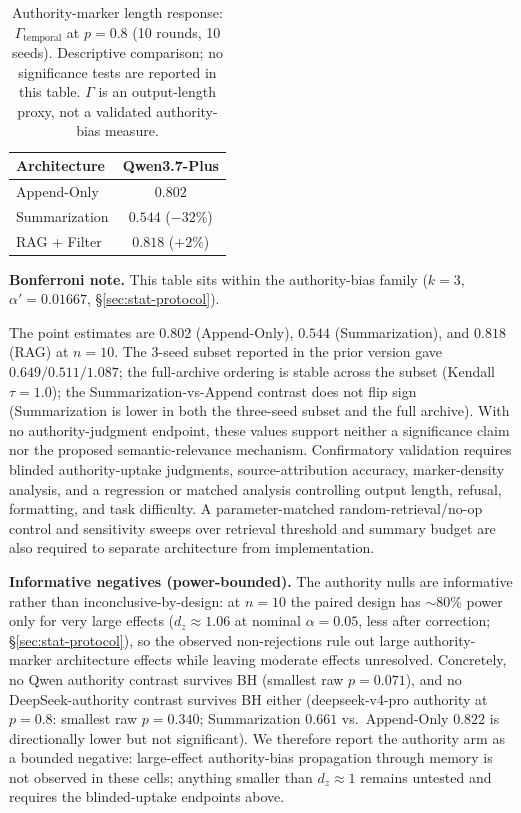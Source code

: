 \documentclass[11pt]{article}
\begin{document}
\begin{table}[htbp]
\centering
\caption{Authority-marker length response: $\Gamma_{\text{temporal}}$ at $p=0.8$ (10 rounds, 10 seeds). Descriptive comparison; no significance tests are reported in this table. $\Gamma$ is an output-length proxy, not a validated authority-bias measure.}
\label{tab:authority}
\begin{tabular}{lc}
\toprule
Architecture & Qwen3.7-Plus \\
\midrule
Append-Only & $0.802$ \\
Summarization & $0.544$ ($-32\%$) \\
RAG + Filter & $0.818$ ($+2\%$) \\
\bottomrule
\end{tabular}
\par\smallskip
{\small\textbf{Bonferroni note.} This table sits within the authority-bias family ($k=3$, $\alpha' = 0.01667$, \S\ref{sec:stat-protocol}).}
\end{table}

The point estimates are $0.802$ (Append-Only), $0.544$ (Summarization), and $0.818$ (RAG) at $n{=}10$. The $3$-seed subset reported in the prior version gave $0.649/0.511/1.087$; the full-archive ordering is stable across the subset (Kendall $\tau=1.0$); the Summarization-vs-Append contrast does not flip sign (Summarization is lower in both the three-seed subset and the full archive). With no authority-judgment endpoint, these values support neither a significance claim nor the proposed semantic-relevance mechanism. Confirmatory validation requires blinded authority-uptake judgments, source-attribution accuracy, marker-density analysis, and a regression or matched analysis controlling output length, refusal, formatting, and task difficulty. A parameter-matched random-retrieval/no-op control and sensitivity sweeps over retrieval threshold and summary budget are also required to separate architecture from implementation.

\textbf{Informative negatives (power-bounded).} The authority nulls are informative rather than inconclusive-by-design: at $n{=}10$ the paired design has $\sim$80\% power only for very large effects ($d_z{\approx}1.06$ at nominal $\alpha{=}0.05$, less after correction; \S\ref{sec:stat-protocol}), so the observed non-rejections rule out large authority-marker architecture effects while leaving moderate effects unresolved. Concretely, no Qwen authority contrast survives BH (smallest raw $p{=}0.071$), and no DeepSeek-authority contrast survives BH either (deepseek-v4-pro authority at $p{=}0.8$: smallest raw $p{=}0.340$; Summarization $0.661$ vs.\ Append-Only $0.822$ is directionally lower but not significant). We therefore report the authority arm as a bounded negative: large-effect authority-bias propagation through memory is not observed in these cells; anything smaller than $d_z{\approx}1$ remains untested and requires the blinded-uptake endpoints above.
\end{document}
